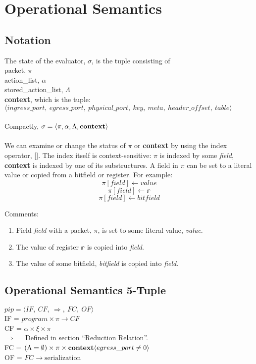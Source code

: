 
\section{Operational Semantics}

\subsection{Notation}
The state of the evaluator, $\sigma$, is the tuple consisting of \\
packet, $\pi$\\
action\_list, $\alpha$ \\
stored\_action\_list, $\Lambda$ \\
\textbf{context}, which is the tuple: \\
$\langle ingress\_port, \ egress\_port, \ physical\_port, \ key, \ meta, \ header\_offset, \ table \rangle$ \\ \\
Compactly, $\sigma = \langle \pi, \alpha, \Lambda, \textbf{\textrm{context}} \rangle$
\\ \\
We can examine or change the status of $\pi$ or \textbf{context} by using the index operator, []. The index itself is context-sensitive: $\pi$ is indexed by some \textit{field}, \textbf{context} is indexed by one of its substructures.
A field in $\pi$ can be set to a literal value or copied from a bitfield or register. For example:
\begin{equation}
  \pi[\textit{field}] \leftarrow \textit{value}
\end{equation}
\begin{equation}
  \pi[\textit{field}] \leftarrow \mathbb{r}
\end{equation}
\begin{equation}
  \pi[\textit{field}] \leftarrow \textit{bitfield}
\end{equation}

Comments:
\begin{enumerate}
\item Field \textit{field} with a packet, $\pi$, is set to some literal value, \textit{value}.
\item The value of register $\mathbb{r}$ is copied into \textit{field}.
\item The value of some bitfield, \textit{bitfield} is copied into \textit{field}.
\end{enumerate}
\subsection{Operational Semantics 5-Tuple}
$ pip = \langle IF, \ CF, \ \Rightarrow, \ FC, \ OF \rangle $\\
IF = $program \times \pi \rightarrow CF$ \\
CF = $\alpha \times \xi \times \pi$ \\
$\Rightarrow$ = Defined in section ``Reduction Relation''. \\
FC = $(\Lambda = \emptyset) \times \pi \times \textbf{\textrm{context}}\langle egress\_port \neq 0 \rangle $ \\
OF = $FC \rightarrow \textrm{serialization}$

